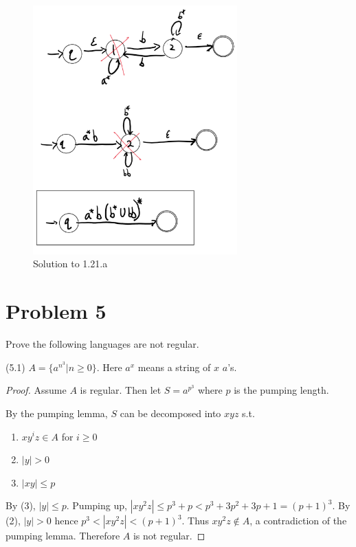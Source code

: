 \documentclass[11pt]{article}
\begin{document}
\begin{figure}[H]
     \centering
     \includegraphics[width = 0.7\textwidth]{1_21a_CSCI338.PNG}
     \caption{Solution to 1.21.a}
     \label{fig:1.21.a}
 \end{figure}

\newpage
\section*{Problem 5}

Prove the following languages are not regular.

(5.1) $A=\{a^{n^3}|n\geq 0\}$. Here $a^x$ means a string of $x$ $a$'s.
\newline

\begin{proof}
Assume $A$ is regular. Then let $S = a^{p^3}$ where $p$ is the pumping length.

By the pumping lemma, $S$ can be decomposed into $xyz$ s.t.

\begin{enumerate}[(1)]
\item $xy^iz \in A$ for $i \geq 0$
\item $|y| > 0$
\item $|xy| \leq p$ 
\end{enumerate}

By (3), $|y| \leq p$. Pumping up, $|xy^2z| \leq p^3 + p < p^3 + 3p^2 + 3p + 1 = (p+1)^3$. By (2), $|y| > 0$ hence $p^3 < |xy^2z| < (p+1)^3$. Thus $xy^2z \notin A$, a contradiction of the pumping lemma. Therefore $A$ is not regular.

\end{proof}
\end{document}
